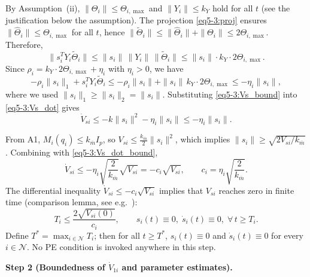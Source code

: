 By Assumption~(ii), $\|\Theta_i\| \le \Theta_{i,\max}$ and $\|Y_i\| \le k_Y$ hold for all $t$
(see the justification below the assumption).  The projection \eqref{eq5-3:proj} ensures
$\|\hat{\Theta}_i\| \le \Theta_{i,\max}$ for all $t$, hence
$\|\tilde{\Theta}_i\| \le \|\hat{\Theta}_i\| + \|\Theta_i\| \le 2\Theta_{i,\max}$.
Therefore,
\begin{equation}
	\|s_i^T Y_i\tilde{\Theta}_i\|
	\le \|s_i\| \, \|Y_i\| \, \|\tilde{\Theta}_i\|
	\le \|s_i\| \cdot k_Y \cdot 2\Theta_{i,\max}. \label{eq5-3:Ytb_bound}
\end{equation}
Since $\rho_i = k_Y \cdot 2\Theta_{i,\max} + \eta_i$ with $\eta_i > 0$, we have
\begin{equation}
	-\rho_i\|s_i\|_1 + s_i^T Y_i\tilde{\Theta}_i
	\le -\rho_i\|s_i\| + \|s_i\| \, k_Y \cdot 2\Theta_{i,\max}
	\le -\eta_i\|s_i\|, \label{eq5-3:Vs_bound}
\end{equation}
where we used $\|s_i\|_1 \ge \|s_i\|_2 = \|s_i\|$.
Substituting \eqref{eq5-3:Vs_bound} into \eqref{eq5-3:Vs_dot} gives
\begin{equation}
	\dot{V}_{si} \le -k\|s_i\|^2 - \eta_i\|s_i\|
	\le -\eta_i\|s_i\|. \label{eq5-3:Vs_dot_bound}
\end{equation}

From A1, $M_i(q_i) \le k_{\overline m} I_p$, so $V_{si} \le \frac{k_{\overline m}}{2}\|s_i\|^2$,
which implies $\|s_i\| \ge \sqrt{2V_{si}/k_{\overline m}}$.  Combining with \eqref{eq5-3:Vs_dot_bound},
\begin{equation}
	\dot{V}_{si} \le -\eta_i \sqrt{\frac{2}{k_{\overline m}}} \sqrt{V_{si}}
	= -c_i \sqrt{V_{si}}, \qquad
	c_i = \eta_i \sqrt{\frac{2}{k_{\overline m}}}. \label{eq5-3:finite_time_ode}
\end{equation}
The differential inequality $\dot{V}_{si} \le -c_i \sqrt{V_{si}}$ implies that $V_{si}$ reaches
zero in finite time (comparison lemma, see e.g.~\cite[Lemma~3.6]{khalilNonlinearSystems2002}):
\begin{equation}
	T_i \le \frac{2\sqrt{V_{si}(0)}}{c_i},
	\qquad
	s_i(t) \equiv 0,\; \dot{s}_i(t) \equiv 0,\; \forall\, t \ge T_i. \label{eq5-3:finite_time}
\end{equation}
Define $T^* = \max_{i\in\mathcal{N}} T_i$; then for all $t \ge T^*$, $s_i(t) \equiv 0$ and
$\dot{s}_i(t) \equiv 0$ for every $i \in \mathcal{N}$.  No PE condition is invoked anywhere
in this step.

\medskip\noindent\textbf{Step 2 (Boundedness of $\dot{V}_{1i}$ and parameter estimates).}

